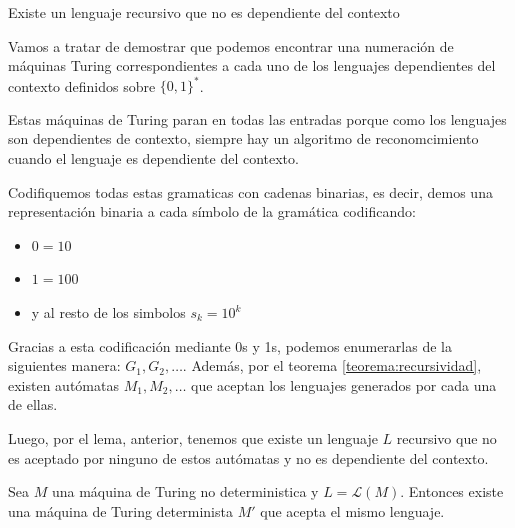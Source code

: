 \begin{lemma}
  Existe un lenguaje recursivo que no es dependiente del contexto
\end{lemma}
\begin{demo}[0.8\textwidth]
  Vamos a tratar de demostrar que podemos encontrar una numeración de máquinas Turing correspondientes a cada uno de los lenguajes dependientes del contexto definidos sobre \(\{0,1\}^*\).
\end{demo}
\begin{demoPart}[0.8\textwidth]
  Estas máquinas de Turing paran en todas las entradas porque como los lenguajes son dependientes de contexto, siempre hay un algoritmo de reconomcimiento cuando el lenguaje es dependiente del contexto.

  Codifiquemos todas estas gramaticas con cadenas binarias, es decir, demos una representación binaria a cada símbolo de la gramática codificando:

  \begin{itemize}
    \item \(0 = 10\)
    \item \(1 = 100\)
    \item y al resto de los simbolos \(s_k = 10^k\)
  \end{itemize}

  Gracias a esta codificación mediante 0s y 1s, podemos enumerarlas de la siguientes manera: \(G_1,G_2,\dots\). Además, por el teorema \ref{teorema:recursividad}, existen autómatas \(M_1, M_2,\dots\) que aceptan los lenguajes generados por cada una de ellas.

  Luego, por el lema, anterior, tenemos que existe un lenguaje \(L\) recursivo que no es aceptado por ninguno de estos autómatas y no es dependiente del contexto.
\end{demoPart}

\begin{teorema}
  Sea \(M\) una máquina de Turing no deterministica y \(L = \mathcal{L}(M)\). Entonces existe una máquina de Turing determinista \(M'\) que acepta el mismo lenguaje.
\end{teorema}

